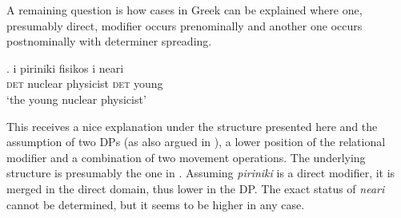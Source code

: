 A remaining question is how cases in Greek can be explained where one, presumably direct, modifier occurs prenominally and another one occurs postnominally with determiner spreading.

\exg. i piriniki fisikos i neari\\
\textsc{det} nuclear physicist \textsc{det} young\\
`the young nuclear physicist’ \label{greek example for tree}

This receives a nice explanation under the structure presented here and the assumption of two DPs (as also argued in \citealt{laenzlinger:2011:elements}), a lower position of the relational modifier and a combination of two movement operations. The underlying structure is presumably the one in . Assuming \textit{piriniki} is a direct modifier, it is merged in the direct domain, thus lower in the DP. The exact status of \textit{neari} cannot be determined, but it seems to be higher in any case.  



